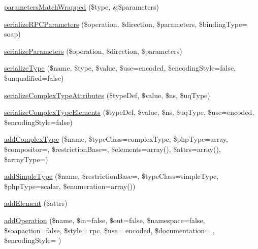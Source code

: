 \begin{DoxyCompactItemize}
\item 
\hyperlink{classwsdl_a5ba30e743ac8f337a13eb915c4128904}{parameters\+Match\+Wrapped} (\$type, \&\$parameters)
\item 
\hyperlink{classwsdl_a20b71dab3c8c6bdad9abb9490a38a48f}{serialize\+R\+P\+C\+Parameters} (\$operation, \$direction, \$parameters, \$binding\+Type= \textquotesingle{}soap\textquotesingle{})
\item 
\hyperlink{classwsdl_afed507a7c4d2b216e27515ca9181361c}{serialize\+Parameters} (\$operation, \$direction, \$parameters)
\item 
\hyperlink{classwsdl_a06a97e7bc4c0fe43b1193177d3266c30}{serialize\+Type} (\$name, \$type, \$value, \$use=\textquotesingle{}encoded\textquotesingle{}, \$encoding\+Style=false, \$unqualified=false)
\item 
\hyperlink{classwsdl_a1bebf04c625f86d2c65c6a2fc4c69f52}{serialize\+Complex\+Type\+Attributes} (\$type\+Def, \$value, \$ns, \$uq\+Type)
\item 
\hyperlink{classwsdl_a9abd63b860271a2010c4d35b5c607b45}{serialize\+Complex\+Type\+Elements} (\$type\+Def, \$value, \$ns, \$uq\+Type, \$use=\textquotesingle{}encoded\textquotesingle{}, \$encoding\+Style=false)
\item 
\hyperlink{classwsdl_a8086789ccd44f879ab77ba98dfa08aa2}{add\+Complex\+Type} (\$name, \$type\+Class=\textquotesingle{}complex\+Type\textquotesingle{}, \$php\+Type=\textquotesingle{}array\textquotesingle{}, \$compositor=\textquotesingle{}\textquotesingle{}, \$restriction\+Base=\textquotesingle{}\textquotesingle{}, \$elements=array(), \$attrs=array(), \$array\+Type=\textquotesingle{}\textquotesingle{})
\item 
\hyperlink{classwsdl_a31228a55d8cdb602e32f481406e7455c}{add\+Simple\+Type} (\$name, \$restriction\+Base=\textquotesingle{}\textquotesingle{}, \$type\+Class=\textquotesingle{}simple\+Type\textquotesingle{}, \$php\+Type=\textquotesingle{}scalar\textquotesingle{}, \$enumeration=array())
\item 
\hyperlink{classwsdl_a7341d393047f63fdcb50dd44d2eff448}{add\+Element} (\$attrs)
\item 
\hyperlink{classwsdl_a629076bad717a1ef68261afe210001fc}{add\+Operation} (\$name, \$in=false, \$out=false, \$namespace=false, \$soapaction=false, \$style= \textquotesingle{}rpc\textquotesingle{}, \$use= \textquotesingle{}encoded\textquotesingle{}, \$documentation= \textquotesingle{}\textquotesingle{}, \$encoding\+Style= \textquotesingle{}\textquotesingle{})
\item 

\end{DoxyCompactItemize}
